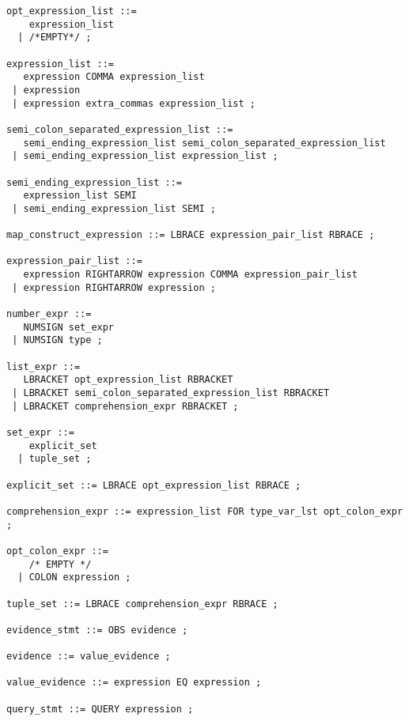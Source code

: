 \documentclass[12pt]{article}
\begin{document}
\begin{verbatim}
opt_expression_list ::= 
    expression_list 
  | /*EMPTY*/ ;

expression_list ::= 
   expression COMMA expression_list
 | expression
 | expression extra_commas expression_list ;

semi_colon_separated_expression_list ::=
   semi_ending_expression_list semi_colon_separated_expression_list
 | semi_ending_expression_list expression_list ;

semi_ending_expression_list ::=
   expression_list SEMI
 | semi_ending_expression_list SEMI ;

map_construct_expression ::= LBRACE expression_pair_list RBRACE ;

expression_pair_list ::=
   expression RIGHTARROW expression COMMA expression_pair_list
 | expression RIGHTARROW expression ;
  
number_expr ::= 
   NUMSIGN set_expr
 | NUMSIGN type ;

list_expr ::= 
   LBRACKET opt_expression_list RBRACKET
 | LBRACKET semi_colon_separated_expression_list RBRACKET
 | LBRACKET comprehension_expr RBRACKET ;

set_expr ::= 
    explicit_set 
  | tuple_set ;

explicit_set ::= LBRACE opt_expression_list RBRACE ;

comprehension_expr ::= expression_list FOR type_var_lst opt_colon_expr ;

opt_colon_expr ::= 
    /* EMPTY */
  | COLON expression ;

tuple_set ::= LBRACE comprehension_expr RBRACE ;

evidence_stmt ::= OBS evidence ;

evidence ::= value_evidence ;

value_evidence ::= expression EQ expression ;

query_stmt ::= QUERY expression ;
\end{verbatim}
\end{document}
